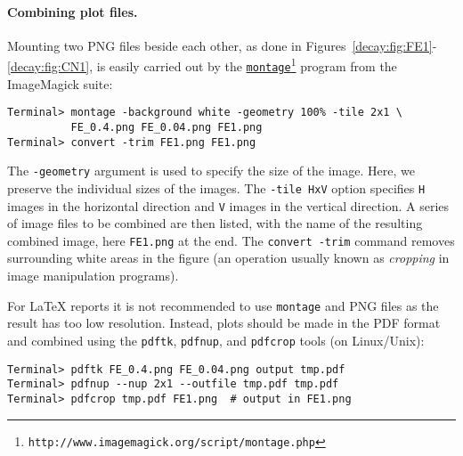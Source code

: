 \documentclass[graybox,sectrefs,envcountresetchap,open=right,final]{svmonodo}
\begin{document}
\paragraph{Combining plot files.}
Mounting two PNG files beside each other, as done in Figures~\ref{decay:fig:FE1}-\ref{decay:fig:CN1}, is easily carried out by the
\href{{http://www.imagemagick.org/script/montage.php}}{\nolinkurl{montage}\footnote{\texttt{http://www.imagemagick.org/script/montage.php}}} program
from the ImageMagick suite:





\begin{Verbatim}[frame=lines,label=\fbox{{\tiny Terminal}},framesep=2.5mm,framerule=0.7pt,fontsize=\fontsize{9pt}{9pt}]
Terminal> montage -background white -geometry 100% -tile 2x1 \ 
          FE_0.4.png FE_0.04.png FE1.png
Terminal> convert -trim FE1.png FE1.png

\end{Verbatim}

The \texttt{-geometry} argument is used to specify the size of the image. Here,
we preserve the individual sizes of the images. The \texttt{-tile HxV} option
specifies \texttt{H} images in the horizontal direction and \texttt{V} images in
the vertical direction. A series of image files to be combined are then listed,
with the name of the resulting combined image, here \texttt{FE1.png} at the end.
The \texttt{convert -trim} command removes surrounding white areas in the figure
(an operation usually known as \emph{cropping} in image manipulation programs).


For {\LaTeX} reports it is not recommended to use \texttt{montage} and PNG files
as the result has too low resolution. Instead, plots should be made
in the PDF format and combined using the \texttt{pdftk}, \texttt{pdfnup}, and \texttt{pdfcrop} tools
(on Linux/Unix):





\begin{Verbatim}[frame=lines,label=\fbox{{\tiny Terminal}},framesep=2.5mm,framerule=0.7pt,fontsize=\fontsize{9pt}{9pt}]
Terminal> pdftk FE_0.4.png FE_0.04.png output tmp.pdf
Terminal> pdfnup --nup 2x1 --outfile tmp.pdf tmp.pdf
Terminal> pdfcrop tmp.pdf FE1.png  # output in FE1.png

\end{Verbatim}
\end{document}
